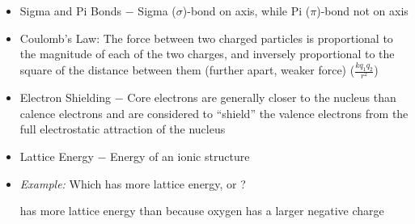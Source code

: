 \documentclass[12pt]{article}
\begin{document}
\begin{itemize}
  \item Sigma and Pi Bonds $-$ Sigma ($\sigma$)-bond on axis, while Pi ($\pi$)-bond not on axis

  \item Coulomb's Law: The force between two charged particles is proportional to the magnitude of each of the two charges, and inversely proportional to the square of the distance between them (further apart, weaker force) ($\frac{kq_1q_2}{r^2}$)

  \item Electron Shielding $-$ Core electrons are generally closer to the nucleus than calence electrons and are considered to ``shield'' the valence electrons from the full electrostatic attraction of the nucleus

  \item Lattice Energy $-$ Energy of an ionic structure

  \item \textit{Example: } Which has more lattice energy,  or ?

    \begin{center}
       has more lattice energy than  because oxygen has a larger negative charge
    \end{center}

\end{itemize}
\end{document}
